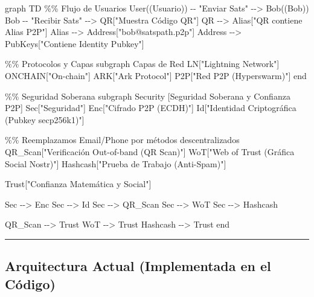 \documentclass[
]{article}
\newenvironment{Shaded}{}{}
\newcommand{\NormalTok}[1]{#1}
\begin{document}
\begin{Shaded}
\begin{Highlighting}[]
\NormalTok{graph TD}
\NormalTok{    \%\% Flujo de Usuarios}
\NormalTok{    User((Usuario)) {-}{-} "Enviar Sats" {-}{-}\textgreater{} Bob((Bob))}
\NormalTok{    Bob {-}{-} "Recibir Sats" {-}{-}\textgreater{} QR["Muestra Código QR"]}
\NormalTok{    QR {-}{-}\textgreater{} Alias["QR contiene Alias P2P"]}
\NormalTok{    Alias {-}{-}\textgreater{} Address["bob@satspath.p2p"]}
\NormalTok{    Address {-}{-}\textgreater{} PubKeys["Contiene Identity Pubkey"]}

\NormalTok{    \%\% Protocolos y Capas}
\NormalTok{    subgraph Capas de Red}
\NormalTok{        LN["Lightning Network"]}
\NormalTok{        ONCHAIN["On{-}chain"]}
\NormalTok{        ARK["Ark Protocol"]}
\NormalTok{        P2P["Red P2P (Hyperswarm)"]}
\NormalTok{    end}

\NormalTok{    \%\% Seguridad Soberana}
\NormalTok{    subgraph Security [Seguridad Soberana y Confianza P2P]}
\NormalTok{        Sec["Seguridad"]}
\NormalTok{        Enc["Cifrado P2P (ECDH)"]}
\NormalTok{        Id["Identidad Criptográfica (Pubkey secp256k1)"]}
        
\NormalTok{        \%\% Reemplazamos Email/Phone por métodos descentralizados}
\NormalTok{        QR\_Scan["Verificación Out{-}of{-}band (QR Scan)"]}
\NormalTok{        WoT["Web of Trust (Gráfica Social Nostr)"]}
\NormalTok{        Hashcash["Prueba de Trabajo (Anti{-}Spam)"]}
        
\NormalTok{        Trust["Confianza Matemática y Social"]}

\NormalTok{        Sec {-}{-}\textgreater{} Enc}
\NormalTok{        Sec {-}{-}\textgreater{} Id}
\NormalTok{        Sec {-}{-}\textgreater{} QR\_Scan}
\NormalTok{        Sec {-}{-}\textgreater{} WoT}
\NormalTok{        Sec {-}{-}\textgreater{} Hashcash}
        
\NormalTok{        QR\_Scan {-}{-}\textgreater{} Trust}
\NormalTok{        WoT {-}{-}\textgreater{} Trust}
\NormalTok{        Hashcash {-}{-}\textgreater{} Trust}
\NormalTok{    end}
\end{Highlighting}
\end{Shaded}

\begin{center}\rule{0.5\linewidth}{0.5pt}\end{center}

\hypertarget{arquitectura-actual-implementada-en-el-cuxf3digo}{%
\subsection{Arquitectura Actual (Implementada en el
Código)}\label{arquitectura-actual-implementada-en-el-cuxf3digo}}
\end{document}
